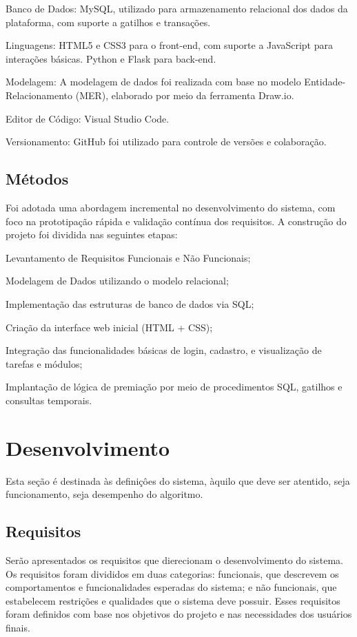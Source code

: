 \documentclass[
	article,			%
	12pt,				%
	oneside,			%
	a4paper,			%
	english,			%
	brazil,				%
	sumario=tradicional
	]{abntex2}
\begin{document}
Banco de Dados: MySQL, utilizado para armazenamento relacional dos dados da plataforma, com suporte a gatilhos e transações.

Linguagens: HTML5 e CSS3 para o front-end, com suporte a JavaScript para interações básicas. Python e Flask para back-end.

Modelagem: A modelagem de dados foi realizada com base no modelo Entidade-Relacionamento (MER), elaborado por meio da ferramenta Draw.io.

Editor de Código: Visual Studio Code.

Versionamento: GitHub foi utilizado para controle de versões e colaboração.


\subsection{Métodos}
Foi adotada uma abordagem incremental no desenvolvimento do sistema, com foco na prototipação rápida e validação contínua dos requisitos. A construção do projeto foi dividida nas seguintes etapas:

Levantamento de Requisitos Funcionais e Não Funcionais;

Modelagem de Dados utilizando o modelo relacional;

Implementação das estruturas de banco de dados via SQL;

Criação da interface web inicial (HTML + CSS);

Integração das funcionalidades básicas de login, cadastro, e visualização de tarefas e módulos;

Implantação de lógica de premiação por meio de procedimentos SQL, gatilhos e consultas temporais.


\section{Desenvolvimento}

Esta seção é destinada às definiçôes do sistema, àquilo que deve ser atentido, seja funcionamento, seja desempenho do algoritmo. 

\subsection{Requisitos}
Serão apresentados os requisitos que dierecionam o desenvolvimento do sistema. Os requisitos foram divididos em duas categorias: funcionais, que descrevem os comportamentos e funcionalidades esperadas do sistema; e não funcionais, que estabelecem restrições e qualidades que o sistema deve possuir. Esses requisitos foram definidos com base nos objetivos do projeto e nas necessidades dos usuários finais.
\end{document}
